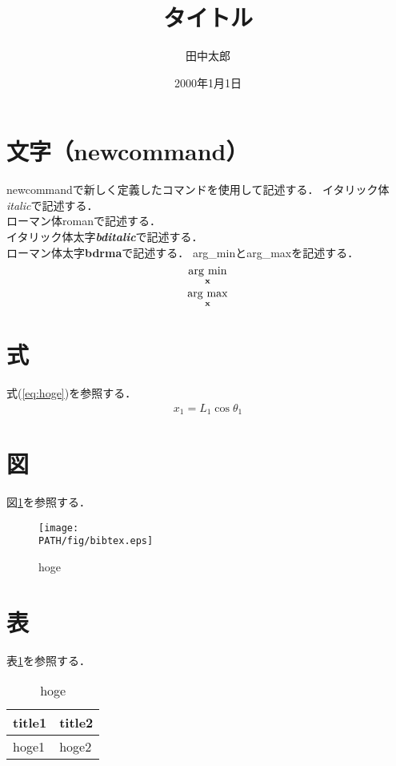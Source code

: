 \documentclass[a4paper,10pt]{jsarticle}
\title{タイトル}%
\author{田中太郎}%
\date{2000年1月1日}%
\newcommand{\ita}[1]{\textit{#1}}%
\newcommand{\rma}[1]{\textrm{#1}}%
\newcommand{\bdit}[1]{\textit{\textbf{#1}}}%
\newcommand{\bdrm}[1]{\textrm{\textbf{#1}}}%
\newcommand{\argmin}{\mathop{\rm arg~min}\limits}%
\newcommand{\argmax}{\mathop{\rm arg~max}\limits}%
\begin{document}
\maketitle%



\section{文字（newcommand）}
newcommandで新しく定義したコマンドを使用して記述する．
イタリック体\ita{italic}で記述する．\\
ローマン体\rma{roman}で記述する．\\
イタリック体太字\bdit{bditalic}で記述する．\\
ローマン体太字\bdrm{bdrma}で記述する．
arg\_minとarg\_maxを記述する．
$$ \argmin_{\bdrm{x}}$$
$$ \argmax_{\bdrm{x}}$$


\section{式}
式(\ref{eq:hoge})を参照する．
\begin{gather}
    x_{1}=L_{1} \cos \theta_{1}
    \label{eq:hoge}
\end{gather}

\section{図}
図\ref{fig:hoge}を参照する．
\begin{figure}[H]
    \begin{center}
        \texttt{[image: \\PATH/fig/bibtex.eps]}
    \end{center}
    \caption{hoge}
    \label{fig:hoge}
\end{figure}

\section{表}
表\ref{tb:hoge}を参照する．
\begin{table}[H]
    \caption{hoge}
    \label{tb:hoge}
    \centering
    \begin{tabular}{ll}
        \hline
        title1 & title2 \\
        \hline \hline
        hoge1 & hoge2 \\
        \hline
    \end{tabular}
\end{table}
\end{document}
